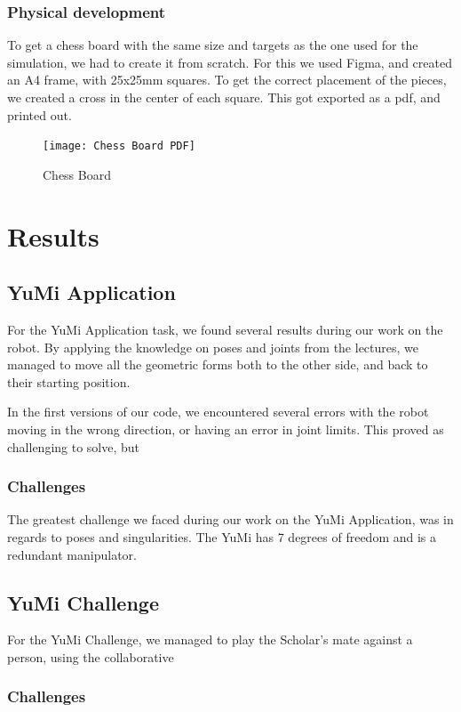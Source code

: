 \documentclass[a4paper,12pt]{article}
\begin{document}
\subsubsection{Physical development}
To get a chess board with the same size and targets as the one used for the simulation, we had to create it from scratch. For this we used Figma, and created an A4 frame, with 25x25mm squares. To get the correct placement of the pieces, we created a cross in the center of each square. This got exported as a pdf, and printed out. 
\begin{figure}
    \centering
    \texttt{[image: Chess Board PDF]}
    \caption{Chess Board}
    \label{fig:enter-label}
\end{figure}
\section{Results}
\subsection{YuMi Application}
For the YuMi Application task, we found several results during our work on the robot. By applying the knowledge on poses and joints from the lectures, we managed to move all the geometric forms both to the other side, and back to their starting position. 

In the first versions of our code, we encountered several errors with the robot moving in the wrong direction, or having an error in joint limits. This proved as challenging to solve, but 



\subsubsection{Challenges}
The greatest challenge we faced during our work on the YuMi Application, was in regards to poses and singularities. 
The YuMi has 7 degrees of freedom and is a redundant manipulator.

\subsection{YuMi Challenge}
For the YuMi Challenge, we managed to play the Scholar's mate against a person, using the collaborative 
\subsubsection{Challenges}
\end{document}
